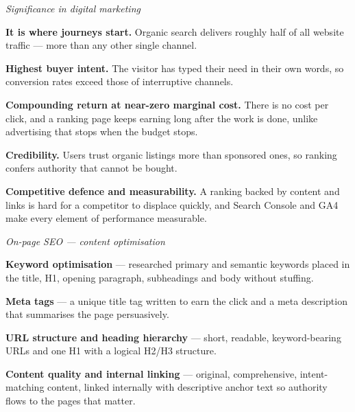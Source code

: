 \begin{qlist}
\textit{Significance in digital marketing}
\begin{apts}\setcounter{enumi}{3}
\item \textbf{It is where journeys start.} Organic search delivers roughly half
      of all website traffic --- more than any other single channel.
\item \textbf{Highest buyer intent.} The visitor has typed their need in their
      own words, so conversion rates exceed those of interruptive channels.
\item \textbf{Compounding return at near-zero marginal cost.} There is no cost
      per click, and a ranking page keeps earning long after the work is done,
      unlike advertising that stops when the budget stops.
\item \textbf{Credibility.} Users trust organic listings more than sponsored
      ones, so ranking confers authority that cannot be bought.
\item \textbf{Competitive defence and measurability.} A ranking backed by
      content and links is hard for a competitor to displace quickly, and
      Search Console and GA4 make every element of performance measurable.
\end{apts}

\textit{On-page SEO --- content optimisation}
\begin{apts}
\item \textbf{Keyword optimisation} --- researched primary and semantic keywords
      placed in the title, H1, opening paragraph, subheadings and body without
      stuffing.
\item \textbf{Meta tags} --- a unique title tag written to earn the click and a
      meta description that summarises the page persuasively.
\item \textbf{URL structure and heading hierarchy} --- short, readable,
      keyword-bearing URLs and one H1 with a logical H2/H3 structure.
\item \textbf{Content quality and internal linking} --- original, comprehensive,
      intent-matching content, linked internally with descriptive anchor text so
      authority flows to the pages that matter.
\end{apts}


\end{qlist}
